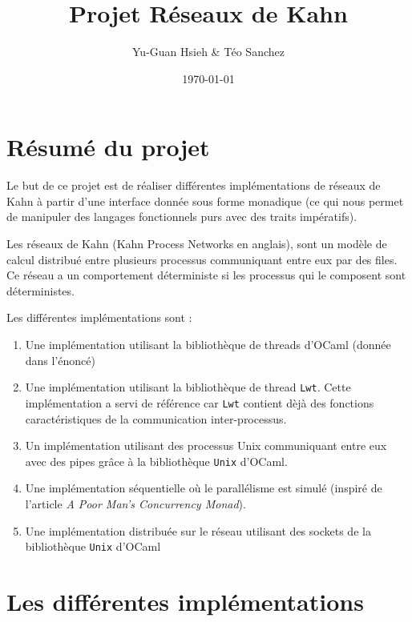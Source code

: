 
\title{Projet Réseaux de Kahn\vspace{-0.5em}}

\author{Yu-Guan Hsieh \& Téo Sanchez}
\date{\today}

\maketitle

\section{Résumé du projet}\label{ruxe9sumuxe9-du-projet}

Le but de ce projet est de réaliser différentes implémentations de
réseaux de Kahn à partir d'une interface donnée sous forme monadique (ce
qui nous permet de manipuler des langages fonctionnels purs avec des
traits impératifs).

Les réseaux de Kahn (Kahn Process Networks en anglais), sont un modèle
de calcul distribué entre plusieurs processus communiquant entre eux par
des files. Ce réseau a un comportement déterministe si les processus qui
le composent sont déterministes.

Les différentes implémentations sont :

\begin{enumerate}
\def\labelenumi{\arabic{enumi}.}
\itemsep1pt\parskip0pt
\item
  Une implémentation utilisant la bibliothèque de threads d'OCaml
  (donnée dans l'énoncé)
\item
  Une implémentation utilisant la bibliothèque de thread \texttt{Lwt}. Cette
    implémentation a servi de référence car \texttt{Lwt} contient dèjà des
  fonctions caractéristiques de la communication inter-processus.
\item
  Un implémentation utilisant des processus Unix communiquant entre eux
  avec des pipes grâce à la bibliothèque \texttt{Unix} d'OCaml.
\item
  Une implémentation séquentielle où le parallélisme est simulé (inspiré
  de l'article \emph{A Poor Man's Concurrency Monad}).
\item
  Une implémentation distribuée sur le réseau utilisant des sockets de
    la bibliothèque \texttt{Unix} d'OCaml
\end{enumerate}

\section{Les différentes
implémentations}\label{les-diffuxe9rentes-impluxe9mentations}

